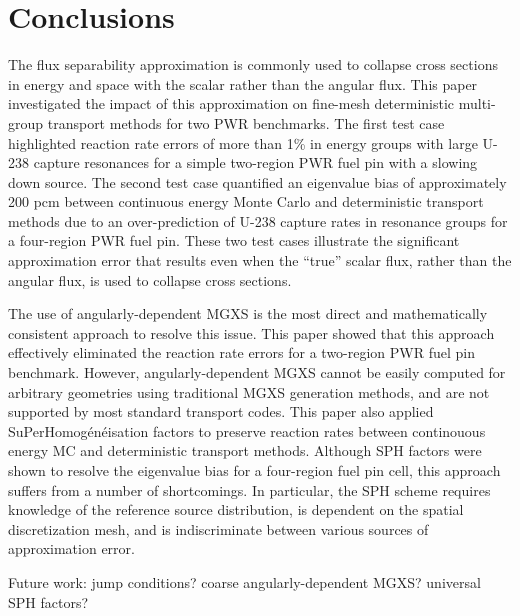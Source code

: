 \section{Conclusions}
\label{sec:conclusions}

The flux separability approximation is commonly used to collapse cross sections in energy and space with the scalar rather than the angular flux. This paper investigated the impact of this approximation on fine-mesh deterministic multi-group transport methods for two PWR benchmarks. The first test case highlighted reaction rate errors of more than 1\% in energy groups with large U-238 capture resonances for a simple two-region PWR fuel pin with a slowing down source. The second test case quantified an eigenvalue bias of approximately 200 pcm between continuous energy Monte Carlo and deterministic transport methods due to an over-prediction of U-238 capture rates in resonance groups for a four-region PWR fuel pin. These two test cases illustrate the significant approximation error that results even when the ``true'' scalar flux, rather than the angular flux, is used to collapse cross sections.



The use of angularly-dependent MGXS is the most direct and mathematically consistent approach to resolve this issue. This paper showed that this approach effectively eliminated the reaction rate errors for a two-region PWR fuel pin benchmark. However, angularly-dependent MGXS cannot be easily computed for arbitrary geometries using traditional MGXS generation methods, and are not supported by most standard transport codes. This paper also applied SuPerHomog\'{e}n\'{e}isation factors to preserve reaction rates between continouous energy MC and deterministic transport methods. Although SPH factors were shown to resolve the eigenvalue bias for a four-region fuel pin cell, this approach suffers from a number of shortcomings. In particular, the SPH scheme requires knowledge of the reference source distribution, is dependent on the spatial discretization mesh, and is indiscriminate between various sources of approximation error.

{\color{red} Future work: jump conditions? coarse angularly-dependent MGXS? universal SPH factors?}
